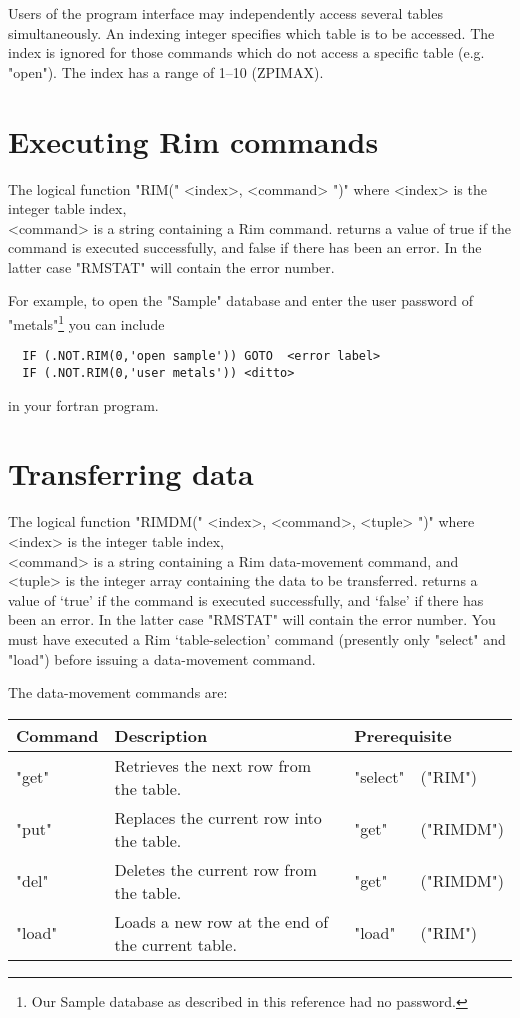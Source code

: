 \documentclass[11pt,a4paper]{report}
\def\I{\index}
\begin{document}
Users of the program interface may independently access several
tables simultaneously.  An indexing integer specifies which
table is to be accessed.
The index is ignored for
those commands which do not access
a specific table (e.g. "open").
The index has a range of 1--10 (ZPIMAX).
 
 
\section{Executing Rim commands}
%
\I{rim@"RIM"}
The logical function
"RIM(" <index>, <command> ")"
where
<index> is the integer table index,\\
       <command> is a string containing a Rim command.
returns a value of true if the command is executed successfully,
and false if there has been an error.  In the latter case
"RMSTAT" will contain the error number.
 
For example, to open the "Sample" database and enter the
user password of "metals"\footnote{Our Sample database
as described in this reference had no password.}
you can include
 
\begin{verbatim}
  IF (.NOT.RIM(0,'open sample')) GOTO  <error label>
  IF (.NOT.RIM(0,'user metals')) <ditto>
\end{verbatim}
 
in your fortran program.
 
\section{Transferring data}
%
\I{rimdm@"RIMDM"}
The logical function
"RIMDM(" <index>, <command>, <tuple> ")"
where
<index> is the integer table index,\\
       <command> is a string containing a Rim data-movement command, and\\
       <tuple> is the integer array containing the data to be transferred.
returns a value of `true' if the command is executed successfully,
and `false' if there has been an error.  In the latter case
"RMSTAT" will contain the error number.
You must have executed a Rim `table-selection' command
(presently only "select" and "load")
before issuing a data-movement command.
 
The data-movement commands are:
 
\medskip
\begin{tabular}{lp{12pc}ll}
Command&
Description&
\multicolumn{2}{l}{Prerequisite}\\
\hline
"get"& Retrieves the next row from the table.& "select"&("RIM")\\
"put"& Replaces the current row into the table.& "get"&("RIMDM")\\
"del"& Deletes the current row from the table.& "get"&("RIMDM")\\
"load"& Loads a new row at the end of the current table.&
                "load"&("RIM")
\end{tabular}
 
\end{document}
